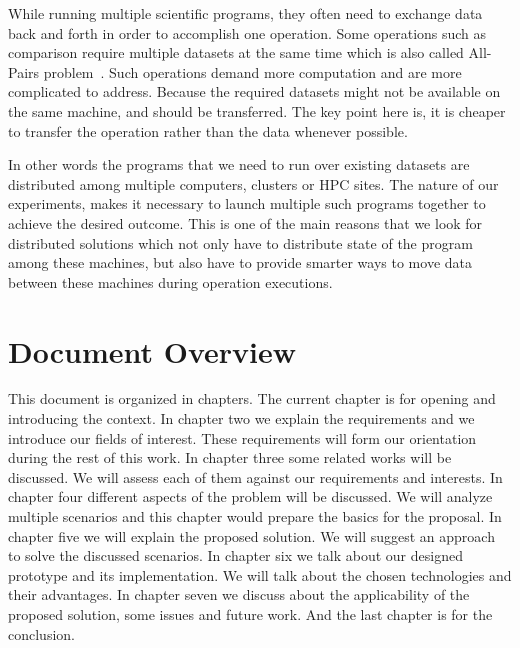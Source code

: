 While running multiple scientific programs, they often need to exchange data back and forth in order to accomplish one operation.
Some operations such as comparison require multiple datasets at the same time which is also called All-Pairs problem~\cite{moretti08}. 
Such operations demand more computation and are more complicated to address. 
Because the required datasets 
might not be available on the same machine, and should be transferred. 
The key point here is, it is cheaper to transfer the operation rather than the data whenever possible. 

In other words the programs that we need to run over existing datasets are distributed among multiple
computers, clusters or HPC sites. The nature of our experiments, makes it necessary to launch
multiple such programs together to achieve the desired outcome. 
This is one of the main reasons that we look
for distributed solutions which not only have to distribute state of the program among these machines,
but also have to provide smarter ways to move data between these machines during operation executions.

\section{Document Overview}
This document is organized in  chapters. 
The current chapter is for opening and introducing the context.
In chapter two we explain the requirements and we introduce our fields of interest. 
These requirements will form our orientation during the rest of this work.
In chapter three some related works will be discussed. 
We will assess each of them against our requirements and interests.
In chapter four different aspects of the problem will be discussed. 
We will analyze multiple scenarios and this chapter would prepare the basics for the proposal.
In chapter five we will explain the proposed solution. 
We will suggest an approach to solve the discussed scenarios.
In chapter six we talk about our designed prototype and its implementation.
We will talk about the chosen technologies and their advantages.
In chapter seven we discuss about the applicability of the proposed solution, some issues and future work.
And the last chapter is for the conclusion.







